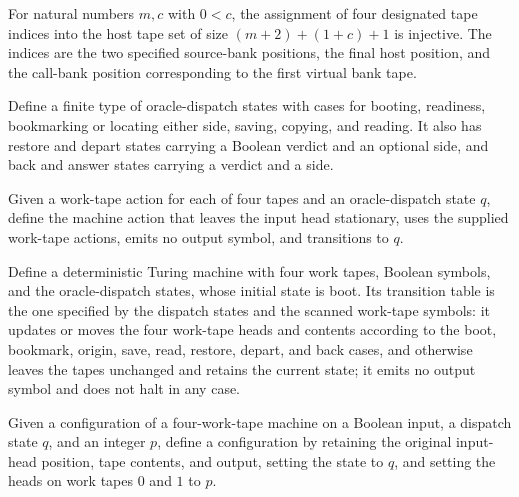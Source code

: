 \begin{theorem}
\label{Turing.oracleSlots_injective}
\leanok
{}
For natural numbers $m,c$ with $0<c$, the assignment of four designated tape indices
into the host tape set of size $(m+2)+(1+c)+1$ is injective. The indices are the two
specified source-bank positions, the final host position, and the call-bank position
corresponding to the first virtual bank tape.
\end{theorem}

\begin{definition}
\label{Turing.OracleDispatch}
\leanok
Define a finite type of oracle-dispatch states with cases for booting, readiness,
bookmarking or locating either side, saving, copying, and reading. It also has restore
and depart states carrying a Boolean verdict and an optional side, and back and answer
states carrying a verdict and a side.
\end{definition}

\begin{definition}
\label{Turing.oracleDispatchAction}
\leanok
{}
Given a work-tape action for each of four tapes and an oracle-dispatch state $q$, define
the machine action that leaves the input head stationary, uses the supplied work-tape
actions, emits no output symbol, and transitions to $q$.
\end{definition}

\begin{definition}
\label{Turing.oracleDispatchTM}
\leanok
{}
Define a deterministic Turing machine with four work tapes, Boolean symbols, and the
oracle-dispatch states, whose initial state is boot. Its transition table is the one
specified by the dispatch states and the scanned work-tape symbols: it updates or moves
the four work-tape heads and contents according to the boot, bookmark, origin, save,
read, restore, depart, and back cases, and otherwise leaves the tapes unchanged and
retains the current state; it emits no output symbol and does not halt in any case.
\end{definition}

\begin{definition}
\label{Turing.oracleWalkCfg}
\leanok
{}
Given a configuration of a four-work-tape machine on a Boolean input, a dispatch state
$q$, and an integer $p$, define a configuration by retaining the original input-head
position, tape contents, and output, setting the state to $q$, and setting the heads on
work tapes $0$ and $1$ to $p$.
\end{definition}

